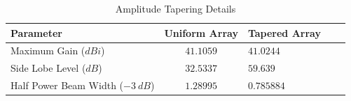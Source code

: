\documentclass[11pt]{witseiepaper}
\begin{document}
\begin{bibunit}[witseie]
\begin{table}[htb]
    \caption{Amplitude Tapering Details}
    \label{tab:AmplitudeTapering}
    \begin{center}
        \begin{tabular}{p{60mm}cp{40mm}cp{40mm}}
            \hline 
            Parameter & Uniform Array & Tapered Array \\
            \hline
            Maximum Gain ($dBi$) & $41.1059$ & $41.0244$ \\
            Side Lobe Level ($dB$) & $32.5337$ & $59.639$ \\
            Half Power Beam Width ($-3~dB$) & $1.28995$ & $0.785884$ \\
            \hline
        \end{tabular}
    \end{center}
\end{table}













\end{bibunit}
\end{document}
